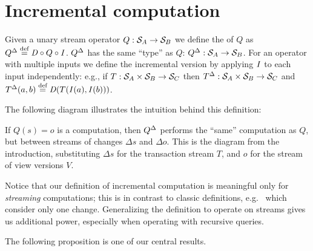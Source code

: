 \section{Incremental computation}\label{sec:incremental}

\begin{definition}
Given a unary stream operator $Q: \mathcal{S}_{A} \to \mathcal{S}_{B}$ we define the 
 of $Q$ as ${Q}^{\Delta} \stackrel{\textrm{\scriptsize def}}{=} \mathit{D} \circ Q \circ \mathit{I}$.
${Q}^{\Delta}$ has the same ``type'' as $Q$: ${Q}^{\Delta}: \mathcal{S}_{A} \to \mathcal{S}_{B}$.
For an operator with multiple inputs we define 
the incremental version by applying $\mathit{I}$ to each input independently:
e.g., if $T: \mathcal{S}_{A} \times \mathcal{S}_{B} \rightarrow \mathcal{S}_{C}$ then
${T}^{\Delta}: \mathcal{S}_{A} \times \mathcal{S}_{B} \rightarrow \mathcal{S}_{C}$
and ${T}^{\Delta}(a, b) \stackrel{\textrm{\scriptsize def}}{=} \mathit{D} (T(\mathit{I}(a), \mathit{I}(b)))$.
\end{definition}

The following diagram illustrates the intuition behind this definition: 

\begin{center}
\end{center}

If $Q(s) = o$ is a computation, then ${Q}^{\Delta}$ performs 
the ``same'' computation as $Q$,
but between streams of changes $\Delta s$ and $\Delta o$.
This is the diagram from the
introduction, substituting $\Delta s$ for the transaction stream $T$, 
and $o$ for the stream of view versions $V$.

Notice that our definition of incremental computation is meaningful only for \emph{streaming}
computations; this is in contrast to classic definitions, e.g.~\cite{gupta-idb95} which
consider only one change.  Generalizing the definition to operate on streams gives us
additional power, especially when operating with recursive queries.

The following proposition is one of our central results.

